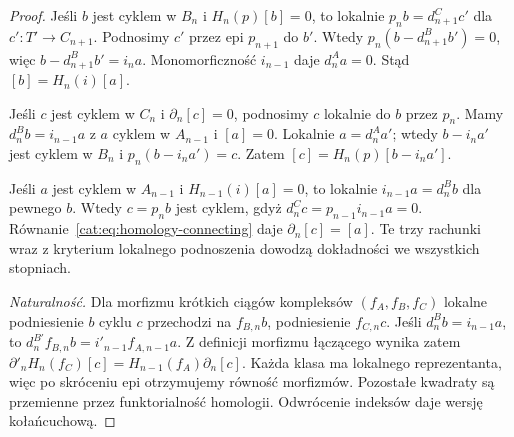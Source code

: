 \begin{proof}
Jeśli $b$ jest cyklem w $B_n$ i $H_n(p)[b]=0$, to lokalnie $p_nb=d_{n+1}^Cc'$ dla $c':T'\to C_{n+1}$. Podnosimy $c'$ przez epi $p_{n+1}$ do $b'$. Wtedy $p_n(b-d_{n+1}^Bb')=0$, więc $b-d_{n+1}^Bb'=i_na$. Monomorficzność $i_{n-1}$ daje $d_n^Aa=0$. Stąd $[b]=H_n(i)[a]$.

Jeśli $c$ jest cyklem w $C_n$ i $\partial_n[c]=0$, podnosimy $c$ lokalnie do $b$ przez $p_n$. Mamy $d_n^Bb=i_{n-1}a$ z $a$ cyklem w $A_{n-1}$ i $[a]=0$. Lokalnie $a=d_n^Aa'$; wtedy $b-i_na'$ jest cyklem w $B_n$ i $p_n(b-i_na')=c$. Zatem $[c]=H_n(p)[b-i_na']$.

Jeśli $a$ jest cyklem w $A_{n-1}$ i $H_{n-1}(i)[a]=0$, to lokalnie $i_{n-1}a=d_n^Bb$ dla pewnego $b$. Wtedy $c=p_nb$ jest cyklem, gdyż $d_n^Cc=p_{n-1}i_{n-1}a=0$. Równanie~\eqref{cat:eq:homology-connecting} daje $\partial_n[c]=[a]$. Te trzy rachunki wraz z kryterium lokalnego podnoszenia dowodzą dokładności we wszystkich stopniach.

\emph{Naturalność.}
Dla morfizmu krótkich ciągów kompleksów $(f_A,f_B,f_C)$ lokalne podniesienie $b$ cyklu $c$ przechodzi na $f_{B,n}b$, podniesienie $f_{C,n}c$. Jeśli $d_n^Bb=i_{n-1}a$, to $d_n^{B'}f_{B,n}b=i'_{n-1}f_{A,n-1}a$. Z definicji morfizmu łączącego wynika zatem
$\partial'_nH_n(f_C)[c]=H_{n-1}(f_A)\partial_n[c]$.
Każda klasa ma lokalnego reprezentanta, więc po skróceniu epi otrzymujemy równość morfizmów. Pozostałe kwadraty są przemienne przez funktorialność homologii. Odwrócenie indeksów daje wersję kołańcuchową.
\end{proof}

